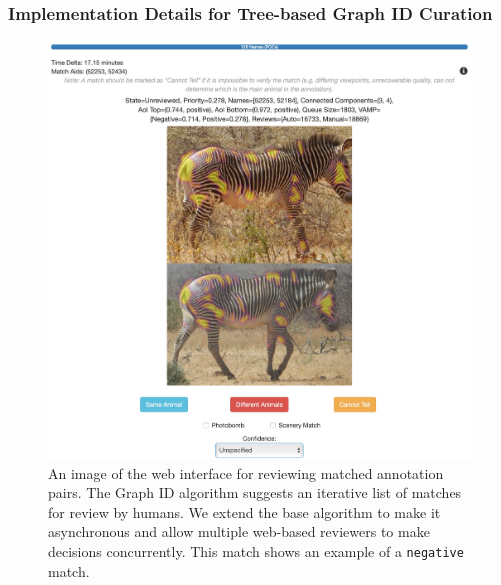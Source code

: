 \subsubsection{Implementation Details for Tree-based Graph ID Curation}

\begin{figure}[!t]
    \begin{center}
        \includegraphics[width=0.85\linewidth]{resources/graph_algorithm.pdf}
    \end{center}
    \caption{An image of the web interface for reviewing matched annotation pairs.  The Graph ID algorithm suggests an iterative list of matches for review by humans.  We extend the base algorithm to make it asynchronous and allow multiple web-based reviewers to make decisions concurrently.  This match shows an example of a \texttt{negative} match.}
    \label{fig:graph-algorithm}
\end{figure}

